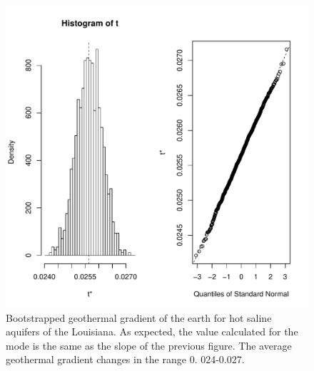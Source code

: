\documentclass[review,authoryear, 12pt]{elsarticle}\usepackage[]{graphicx}\usepackage[]{color}
\makeatletter
\def\maxwidth{ %
  \ifdim\Gin@nat@width>\linewidth
    \linewidth
  \else
    \Gin@nat@width
  \fi
}
\newenvironment{knitrout}{}{} %
\makeatother
\begin{document}
\begin{knitrout}
\color{fgcolor}\begin{figure}[]

\includegraphics[width=\maxwidth]{figure/bootstrap_plot} \caption[Bootstrapped geothermal gradient of the earth for hot saline aquifers of the Louisiana]{Bootstrapped geothermal gradient of the earth for hot saline aquifers of the Louisiana. As expected, the value calculated for the mode is the same as the slope of the previous figure. The average geothermal gradient changes in the range 0. 024-0.027.\label{Fig:bootstrap_plot}}
\end{figure}


\end{knitrout}




\end{document}
